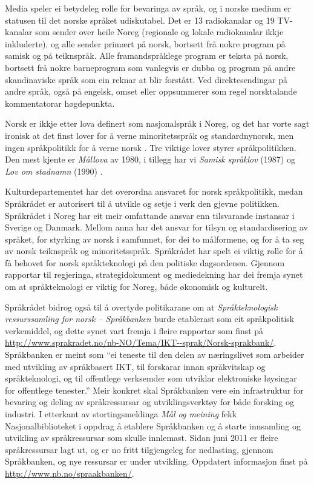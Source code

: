 \begin{multicols}{2}
Media speler ei betydeleg rolle for bevaringa av språk, og i norske medium er statusen til det norske språket udiskutabel. Det er 13 radiokanalar og 19 TV-kanalar som sender over heile Noreg (regionale og lokale radiokanalar ikkje inkluderte), og alle sender primært på norsk, bortsett frå nokre program på samisk og på teiknspråk. 
Alle framandspråklege program er teksta på norsk, bortsett frå nokre barneprogram som vanlegvis er dubba og program på andre skandinaviske språk som ein reknar at blir forstått. 
Ved direktesendingar på andre språk, også på engelsk, omset eller oppsummerer som regel norsktalande kommentatorar høgdepunkta.

Norsk er ikkje etter lova definert som nasjonalspråk i Noreg, og det har vorte sagt ironisk at det finst lover for å verne minoritetsspråk og standardnynorsk, men ingen språkpolitikk for å verne norsk \cite{nih:2005}. 
Tre viktige lover styrer språkpolitikken. Den mest kjente er \textit{Mållova} av 1980, i tillegg har vi \textit{Samisk språklov} (1987) og \textit{Lov om stadnamn} (1990) \cite{stm35:2008}.

Kulturdepartementet har det overordna ansvaret for norsk språkpolitikk, medan Språkrådet er autorisert til å utvikle og setje i verk den gjevne politikken. Språkrådet i Noreg har eit meir omfattande ansvar enn tilsvarande instansar i Sverige og Danmark. 
Mellom anna har det ansvar for tilsyn og standardisering av språket, for styrking av norsk i samfunnet, for dei to målformene, og for å ta seg av norsk teiknspråk og minoritetsspråk. 
Språkrådet har spelt ei viktig rolle for å få behovet for norsk språkteknologi på den politiske dagsordenen. 
Gjennom rapportar til regjeringa, strategidokument og mediedekning har dei fremja synet om at språkteknologi er viktig for Noreg, både økonomisk og kulturelt.


Språkrådet bidrog også til å overtyde politikarane om at \textit{Språkteknologisk ressurssamling for norsk – Språkbanken} burde etablerast som eit språkpolitisk verkemiddel, og dette synet vart fremja i fleire rapportar som finst på \url{http://www.sprakradet.no/nb-NO/Tema/IKT--sprak/Norsk-sprakbank/}.
Språkbanken er meint som ``ei teneste til den delen av næringslivet som arbeider med utvikling av språkbasert IKT, til forskarar innan språkvitskap og språkteknologi, og til offentlege verksemder som utviklar elektroniske løysingar for offentlege tenester.'' %
Meir konkret skal Språkbanken vere ein infrastruktur for bevaring og deling av språkressursar og utviklingsverktøy for både forsking og industri. 
I etterkant av stortingsmeldinga \textit{Mål og meining} \cite{stm35:2008} fekk Nasjonalbiblioteket i oppdrag å etablere Språkbanken og å starte innsamling og utvikling av språkressursar som skulle innlemast. 
Sidan juni 2011 er fleire språkressursar lagt ut, og er no fritt tilgjengeleg for nedlasting, gjennom Språkbanken, og nye ressursar er under utvikling.
Oppdatert informasjon finst på \url{http://www.nb.no/spraakbanken/}.


\end{multicols}

